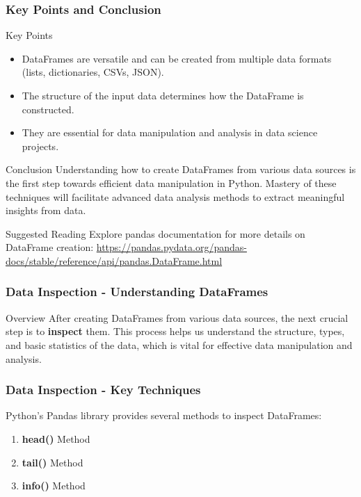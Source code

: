 \documentclass[aspectratio=169]{beamer}
\begin{document}
\begin{frame}[fragile]
    \frametitle{Key Points and Conclusion}
    \begin{block}{Key Points}
        \begin{itemize}
            \item DataFrames are versatile and can be created from multiple data formats (lists, dictionaries, CSVs, JSON).
            \item The structure of the input data determines how the DataFrame is constructed.
            \item They are essential for data manipulation and analysis in data science projects.
        \end{itemize}
    \end{block}

    \begin{block}{Conclusion}
        Understanding how to create DataFrames from various data sources is the first step towards efficient data manipulation in Python. 
        Mastery of these techniques will facilitate advanced data analysis methods to extract meaningful insights from data.
    \end{block}
    
    \begin{block}{Suggested Reading}
        Explore pandas documentation for more details on DataFrame creation: 
        \url{https://pandas.pydata.org/pandas-docs/stable/reference/api/pandas.DataFrame.html}
    \end{block}
\end{frame}

\begin{frame}[fragile]
    \frametitle{Data Inspection - Understanding DataFrames}
    \begin{block}{Overview}
        After creating DataFrames from various data sources, the next crucial step is to \textbf{inspect} them. 
        This process helps us understand the structure, types, and basic statistics of the data, which is vital for effective data manipulation and analysis.
    \end{block}
\end{frame}

\begin{frame}[fragile]
    \frametitle{Data Inspection - Key Techniques}
    Python's Pandas library provides several methods to inspect DataFrames:
    \begin{enumerate}
        \item \textbf{head()} Method
        \item \textbf{tail()} Method
        \item \textbf{info()} Method
    \end{enumerate}
\end{frame}
\end{document}
